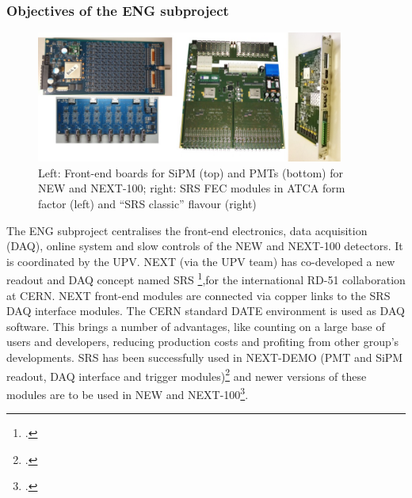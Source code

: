 %
%

\subsubsection*{Objectives of the ENG subproject}

\begin{figure}[h!]
\begin{center}
\includegraphics[width=0.9\textwidth]{img/Electronics.jpg}
\end{center}
\caption{\label{Fig:FEE} Left: Front-end boards for SiPM (top) and PMTs (bottom) for NEW and NEXT-100; right: SRS FEC modules in ATCA form factor (left) and “SRS classic” flavour (right) }
\end{figure}

The ENG subproject centralises the front-end electronics, data acquisition (DAQ), online system and slow controls of the NEW and NEXT-100 detectors. It is coordinated by the UPV.
NEXT (via the UPV team) has co-developed a new readout and DAQ concept named SRS \footcite{Toledo2011,SRS2013},for the international RD-51 collaboration at CERN. NEXT front-end modules are connected via copper links to the SRS DAQ interface modules. The CERN standard DATE environment is used as DAQ software. This brings a number of advantages, like counting on a large base of users and developers, reducing production costs and profiting from other group’s developments. SRS has been successfully used in NEXT-DEMO (PMT and SiPM readout, DAQ interface and trigger modules)\footcite{Gil2012,Herrero2012,Esteve2012} and newer versions of these modules are to be used in NEW and NEXT-100\footcite{TWEPP2014}.

